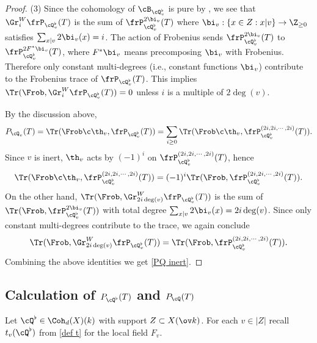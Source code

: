 \begin{proof}
(3) Since the cohomology of $\cB_{\cQ^{\flat}_{v}}$ is pure by \cite[Corollary 2.3(3)]{HS77}, we see that $\Gr^{W}_{i}\frP_{\cQ^{\flat}_{v}}(T)$ is the sum of $\frP^{2\bi_{v}}_{\cQ^{\flat}_{v}}(T)$ where $\bi_{v}: \{x\in Z: x|v\}\to \Z_{\ge0}$ satisfies $\sum_{x|v}2\bi_{v}(x)=i$. The action of Frobenius sends $\frP^{2\bi_{v}}_{\cQ^{\flat}_{v}}(T)$ to $\frP^{2F^{*}\bi_{v}}_{\cQ^{\flat}_{v}}(T)$, where $F^{*}\bi_{v}$ means precomposing $\bi_{v}$ with Frobenius. Therefore only constant multi-degrees (i.e., constant functions $\bi_{v}$) contribute to the Frobenius trace of $\frP_{\cQ^{\flat}_{v}}(T)$. This implies $\Tr(\Frob, \Gr^{W}_{i}\frP_{\cQ^{\flat}_{v}}(T))=0$ unless $i$ is a multiple of $2\deg(v)$.

By the discussion above,
\begin{equation*}
P_{\cQ_{v}}(T)=\Tr(\Frob\c\th_{v},  \frP_{\cQ^{\flat}_{v}}(T))=\sum_{i\ge0}\Tr(\Frob\c\th_{v}, \frP^{(2i,2i,\cdots,2i)}_{\cQ^{\flat}_{v}}(T)).
\end{equation*}
Since $v$ is inert, $\th_{v}$ acts by $(-1)^{i}$ on $\frP^{(2i,2i,\cdots,2i)}_{\cQ^{\flat}_{v}}(T)$, hence
\begin{equation*}
\Tr(\Frob\c\th_{v}, \frP^{(2i,2i,\cdots,2i)}_{\cQ^{\flat}_{v}}(T))=(-1)^{i}\Tr(\Frob, \frP^{(2i,2i,\cdots,2i)}_{\cQ^{\flat}_{v}}(T)).
\end{equation*}
On the other hand,  $\Tr(\Frob, \Gr^{W}_{2i\deg(v)}\frP_{\cQ^{\flat}_{v}}(T))$ is the sum of $\Tr(\Frob, \frP^{2\bi_{v}}_{\cQ^{\flat}_{v}}(T))$ with total degree $\sum_{x|v}2\bi_{v}(x)=2i\deg(v)$. Since only constant multi-degrees contribute to the trace, we again conclude
\begin{equation*}
\Tr(\Frob, \Gr^{W}_{2i\deg(v)}\frP_{\cQ^{\flat}_{v}}(T))=\Tr(\Frob, \frP^{(2i,2i,\cdots,2i)}_{\cQ^{\flat}_{v}}(T)).
\end{equation*}
Combining the above identities we get \eqref{PQ inert}.
\end{proof}




\subsection{Calculation of $P_{\cQ^{\flat}}(T)$ and $P_{\cQ}(T)$}

Let $\cQ^{\flat}\in \Coh_{d}(X)(k)$ with support $Z\subset X(\ov k)$. For each $v\in |Z|$ recall $t_{v}(\cQ^{\flat})$ from \eqref{def t} for the local field $F_{v}$.

